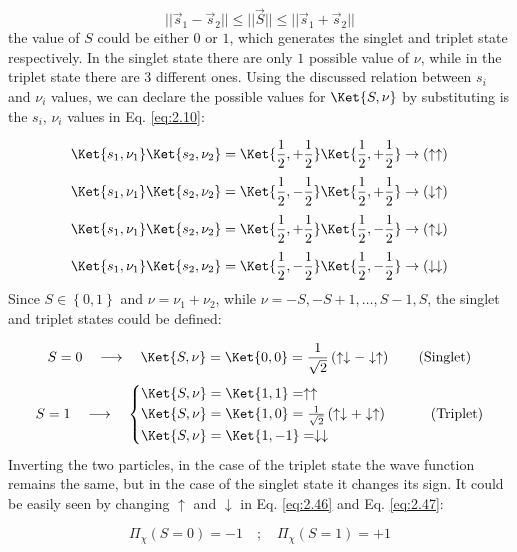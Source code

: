 \begin{equation} \label{eq:2.41}
	|| \vec{s}_{1} - \vec{s}_{2} || \leq || \vec{S} || \leq || \vec{s}_{1} + \vec{s}_{2} ||
\end{equation}
the value of $S$ could be either $0$ or $1$, which generates the singlet and triplet state respectively. In the singlet state there are only $1$ possible value of $\nu$, while in the triplet state there are $3$ different ones. Using the discussed relation between $s_{i}$ and $\nu_{i}$ values, we can declare the possible values for $\Ket{S, \nu}$ by substituting is the $s_{i}$, $\nu_{i}$ values in Eq. \eqref{eq:2.10}:

\begin{equation} \label{eq:2.42}
	\Ket{s_{1}, \nu_{1}} \Ket{s_{2}, \nu_{2}}
	=
	\Ket{\frac{1}{2}, +\frac{1}{2}} \Ket{\frac{1}{2}, +\frac{1}{2}}
	\to
	\left( \uparrow \uparrow \right)
\end{equation}
\begin{equation} \label{eq:2.43}
	\Ket{s_{1}, \nu_{1}} \Ket{s_{2}, \nu_{2}}
	=
	\Ket{\frac{1}{2}, -\frac{1}{2}} \Ket{\frac{1}{2}, +\frac{1}{2}}
	\to
	\left( \downarrow \uparrow \right)
\end{equation}
\begin{equation} \label{eq:2.44}
	\Ket{s_{1}, \nu_{1}} \Ket{s_{2}, \nu_{2}}
	=
	\Ket{\frac{1}{2}, +\frac{1}{2}} \Ket{\frac{1}{2}, -\frac{1}{2}}
	\to
	\left( \uparrow \downarrow \right)
\end{equation}
\begin{equation} \label{eq:2.45}
	\Ket{s_{1}, \nu_{1}} \Ket{s_{2}, \nu_{2}}
	=
	\Ket{\frac{1}{2}, -\frac{1}{2}} \Ket{\frac{1}{2}, -\frac{1}{2}}
	\to
	\left( \downarrow \downarrow \right)
\end{equation}
Since $S \in \left\{ 0, 1 \right\}$ and $\nu = \nu_{1} + \nu_{2}$, while $\nu = -S, -S+1, \dots, S-1, S$, the singlet and triplet states could be defined:

\begin{equation} \label{eq:2.46}
	S = 0
	\quad \longrightarrow \quad
	\Ket{S, \nu} = \Ket{0,0} = \frac{1}{\sqrt{2}} \left( \uparrow \downarrow - \downarrow \uparrow \right)
	\quad \quad
	\text{(Singlet)}
\end{equation}
\begin{equation} \label{eq:2.47}
	S = 1
	\quad \longrightarrow \quad
	\begin{cases}	
		\Ket{S, \nu} = \Ket{1,1} = \uparrow \uparrow \\
		\Ket{S, \nu} = \Ket{1,0} = \frac{1}{\sqrt{2}} \left( \uparrow \downarrow + \downarrow \uparrow \right) \\
		\Ket{S, \nu} = \Ket{1,-1} = \downarrow \downarrow
	\end{cases}	
	\quad \quad
	\text{(Triplet)}
\end{equation}
Inverting the two particles, in the case of the triplet state the wave function remains the same, but in the case of the singlet state it changes its sign. It could be easily seen by changing $\uparrow$ and $\downarrow$ in Eq. \eqref{eq:2.46} and Eq. \eqref{eq:2.47}:

\begin{equation} \label{eq:2.48}
	\Pi_{\chi} \left( S=0 \right) = -1
	\quad ; \quad
	\Pi_{\chi} \left( S=1 \right) = +1
\end{equation}